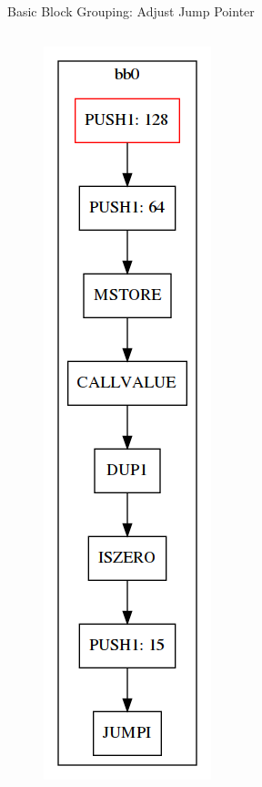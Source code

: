 \documentclass[11pt]{beamer}
\begin{document}
\begin{frame}{Basic Block Grouping: Adjust Jump Pointer}
\begin{columns}
{\begin{figure}
        \includegraphics[scale=0.25]{figures/stack/cfg_stack1.png}
    \end{figure}
}
\end{columns}
\end{frame}
\end{document}
